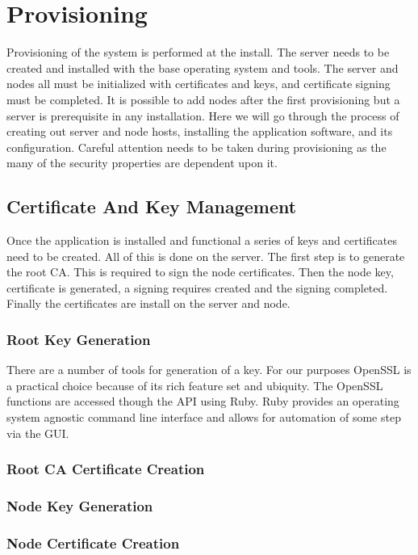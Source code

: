 \chapter{Provisioning}
Provisioning of the system is performed at the install. The server needs to be created and installed with the base operating system and tools.  The server and nodes all must be initialized with certificates and keys, and certificate signing must be completed.  
It is possible to add nodes after the first provisioning but a server is prerequisite in any installation.  Here we will go through the process of creating out server and node hosts, installing the application software, and its configuration.  Careful attention needs to be taken during provisioning as the many of the security properties are dependent upon it.

\section{Certificate And Key Management}
Once the application is installed and functional a series of keys and certificates need to be created. All of this is done on the server. The first step is to generate the root CA. This is required to sign the node certificates. Then the node key, certificate is generated, a signing requires created and the signing completed.  Finally the certificates are install on the server and node. 

\subsection{Root Key Generation}
There are a number of tools for generation of a key. For our purposes OpenSSL is a practical choice because of its rich feature set and ubiquity. The OpenSSL functions are accessed though the API using Ruby\cite{Anonymous:PuXCJCvx}. Ruby provides an operating system agnostic command line interface and allows for automation of some step via the GUI.
\subsection{Root CA Certificate Creation}


\subsection{Node Key Generation}
\subsection{Node Certificate Creation}
